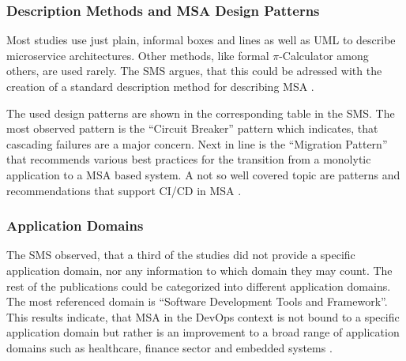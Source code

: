 \subsubsection{Description Methods and MSA Design Patterns}

Most studies use just plain, informal boxes and lines as well as UML to
describe microservice architectures. Other methods, like formal $\pi$-Calculator
among others, are used rarely. The SMS argues, that this could be adressed with
the creation of a standard description method for describing MSA
\cite{waseem:SMSMSADevOps}.

The used design patterns are shown in the corresponding table in the SMS.
The most observed pattern is the ``Circuit Breaker'' \cite{montesi:CircuitBreakers} pattern which indicates,
that cascading failures are a major concern. Next in line is the ``Migration
Pattern'' \cite{waseem:SMSMSADevOps} that recommends various best practices for the transition from
a monolytic application to a MSA based system.
A not so well covered topic are patterns and recommendations
that support CI/CD in MSA \cite{waseem:SMSMSADevOps}.

\subsubsection{Application Domains}

The SMS observed, that a third of the studies did not provide a specific application
domain, nor any information to which domain they may count. The rest of the publications
could be categorized into different application domains. The most referenced domain
is ``Software Development Tools and Framework''. This results indicate, that MSA
in the DevOps context is not bound to a specific application domain but rather is
an improvement to a broad range of application domains such as healthcare, finance sector
and embedded systems \cite{waseem:SMSMSADevOps}.
